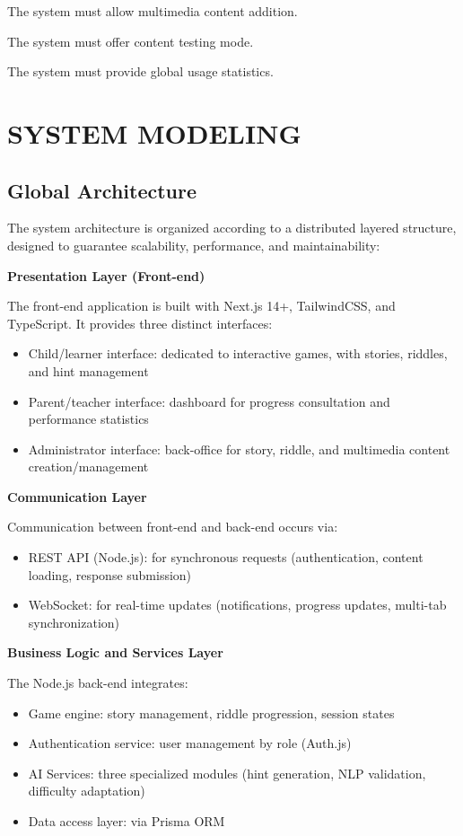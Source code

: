 \documentclass[12pt,a4paper]{article}
\begin{document}
The system must allow multimedia content addition.

The system must offer content testing mode.

The system must provide global usage statistics.

\newpage

\section{SYSTEM MODELING}

\subsection{Global Architecture}

The system architecture is organized according to a distributed layered structure, designed to guarantee scalability, performance, and maintainability:

\textbf{Presentation Layer (Front-end)}

The front-end application is built with Next.js 14+, TailwindCSS, and TypeScript. It provides three distinct interfaces:
\begin{itemize}
    \item Child/learner interface: dedicated to interactive games, with stories, riddles, and hint management
    \item Parent/teacher interface: dashboard for progress consultation and performance statistics
    \item Administrator interface: back-office for story, riddle, and multimedia content creation/management
\end{itemize}

\textbf{Communication Layer}

Communication between front-end and back-end occurs via:
\begin{itemize}
    \item REST API (Node.js): for synchronous requests (authentication, content loading, response submission)
    \item WebSocket: for real-time updates (notifications, progress updates, multi-tab synchronization)
\end{itemize}

\textbf{Business Logic and Services Layer}

The Node.js back-end integrates:
\begin{itemize}
    \item Game engine: story management, riddle progression, session states
    \item Authentication service: user management by role (Auth.js)
    \item AI Services: three specialized modules (hint generation, NLP validation, difficulty adaptation)
    \item Data access layer: via Prisma ORM
\end{itemize}
\end{document}
